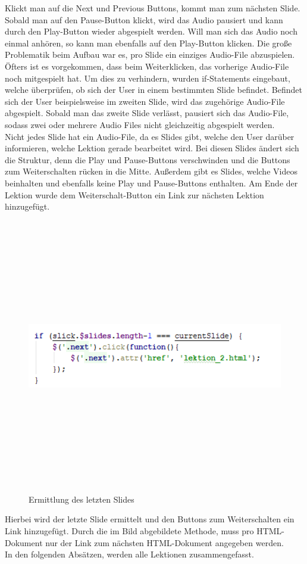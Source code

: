 Klickt man auf die Next und Previous Buttons, kommt man zum nächsten Slide. Sobald man auf den Pause-Button klickt, wird das Audio pausiert und kann durch den Play-Button wieder abgespielt werden. Will man sich das Audio noch einmal anhören, so kann man ebenfalls auf den Play-Button klicken. Die große Problematik beim Aufbau war es, pro Slide ein einziges Audio-File abzuspielen. Öfters ist es vorgekommen, dass beim Weiterklicken, das vorherige Audio-File noch mitgespielt hat. Um dies zu verhindern, wurden if-Statements eingebaut, welche überprüfen, ob sich der User in einem bestimmten Slide befindet. Befindet sich der User beispielsweise im zweiten Slide, wird das zugehörige Audio-File abgespielt. Sobald man das zweite Slide verlässt, pausiert sich das Audio-File, sodass zwei oder mehrere Audio Files nicht gleichzeitig abgespielt werden. \leavevmode \\
Nicht jedes Slide hat ein Audio-File, da es Slides gibt, welche den User darüber informieren, welche Lektion gerade bearbeitet wird. Bei diesen Slides ändert sich die Struktur, denn die Play und Pause-Buttons verschwinden und die Buttons zum Weiterschalten rücken in die Mitte. Außerdem gibt es Slides, welche Videos beinhalten und ebenfalls keine Play und Pause-Buttons enthalten. Am Ende der Lektion wurde dem Weiterschalt-Button ein Link zur nächsten Lektion hinzugefügt. 
\begin{figure} [H]
	\centering
\includegraphics[width=12cm,height=12cm,keepaspectratio]{webseite_abb11} 
	\caption{Ermittlung des letzten Slides}
\end{figure}
Hierbei wird der letzte Slide ermittelt und den Buttons zum Weiterschalten ein Link hinzugefügt. Durch die im Bild abgebildete Methode, muss pro HTML-Dokument nur der Link zum nächsten HTML-Dokument angegeben werden. \leavevmode \\
In den folgenden Absätzen, werden alle Lektionen zusammengefasst. 
